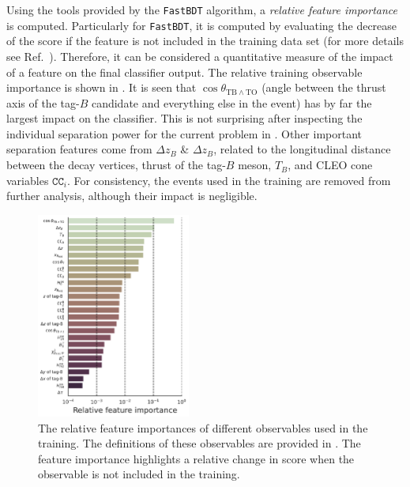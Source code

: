 Using the tools provided by the \texttt{FastBDT} algorithm, a \textit{relative feature importance} is computed.
Particularly for \texttt{FastBDT}, it is computed by evaluating the decrease of the \AUC score if the feature is not included in the training data set (for more details see Ref.~\cite{Keck:2017gsv}).
Therefore, it can be considered a quantitative measure of the impact of a feature on the final classifier output.
The relative training observable importance is shown in . 
It is seen that $\cos\theta_{\mathrm{TB}\wedge\mathrm{TO}}$ (angle between the thrust axis of the tag-$B$ candidate and everything else in the event) has by far the largest impact on the classifier.
This is not surprising after inspecting the individual separation power for the current problem in .
Other important separation features come from  $\Delta z_B$ \&  $\Delta z_B$, related to the longitudinal distance between the decay vertices,
thrust of the tag-$B$ meson, $T_B$, and CLEO cone variables $\mathtt{CC}_i$. 
For consistency, the events used in the training are removed from further analysis, although their impact is negligible.

\begin{figure}[htbp!]
    \centering
    \includegraphics[width=0.45\textwidth]{figures/continuum_suppression/feature_importance.pdf}
    \caption{\label{fig:feature_importance} The relative feature importances of different observables used in the training.
    The definitions of these observables are provided in .
    The feature importance highlights a relative change in \AUC score when the observable is not included in the training.
    }
\end{figure}

